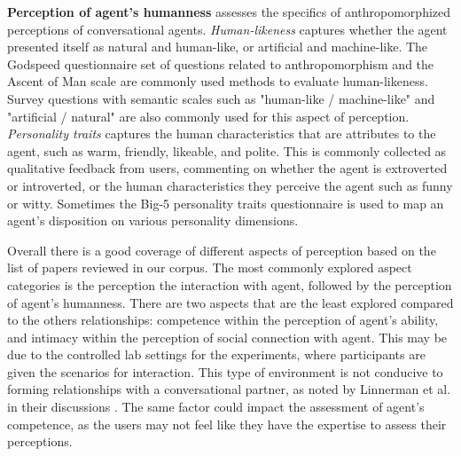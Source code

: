 \documentclass[sigconf,screen,review, anonymous]{acmart}
\newcommand{\cmt}[1]{}%
\begin{document}
\textbf{Perception of agent's humanness} assesses the specifics of anthropomorphized perceptions of conversational agents. \textit{Human-likeness} captures whether the agent presented itself as natural and human-like, or artificial and machine-like. The Godspeed questionnaire \cite{bartneck2009measurement}\cmt{godspeed} set of questions related to anthropomorphism and the Ascent of Man scale \cite{kteily2015ascent} are commonly used methods to evaluate human-likeness. Survey questions with semantic scales such as "human-like / machine-like" and "artificial / natural" are also commonly used for this aspect of perception. \textit{Personality traits} captures the human characteristics that are attributes to the agent, such as warm, friendly, likeable, and polite. This is commonly collected as qualitative feedback from users, commenting on whether the agent is extroverted or introverted, or the human characteristics they perceive the agent such as funny or witty. Sometimes the Big-5 personality traits questionnaire \cite{gosling2003very} is used to map an agent's disposition on various personality dimensions.

Overall there is a good coverage of different aspects of perception based on the list of papers reviewed in our corpus. The most commonly explored aspect categories is the perception the interaction with agent, followed by the perception of agent's humanness. There are two aspects that are the least explored compared to the others relationships: competence within the perception of agent's ability, and intimacy within the perception of social connection with agent. This may be due to the controlled lab settings for the experiments, where participants are given the scenarios for interaction. This type of environment is not conducive to forming relationships with a conversational partner, as noted by Linnerman et al. in their discussions \cite{linnemann2018can}\cmt{[15]}. The same factor could impact the assessment of agent's competence, as the users may not feel like they have the expertise to assess their perceptions. 
\end{document}
